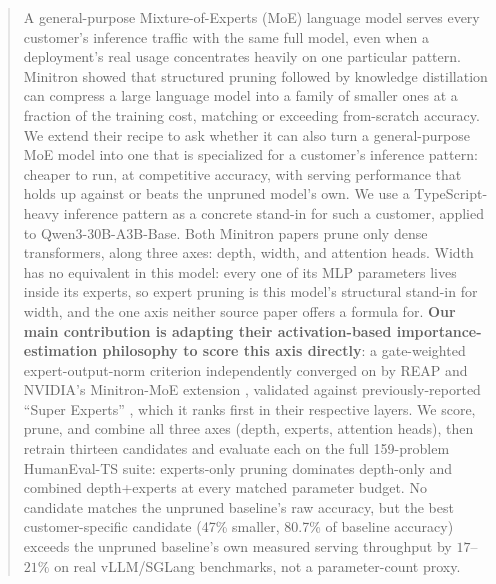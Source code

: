 \documentclass{article}
\theoremstyle{plain}
\theoremstyle{definition}
\theoremstyle{remark}
\begin{document}

{\let\thefootnote\relax{}}

\begin{abstract}
A general-purpose Mixture-of-Experts (MoE) language model serves every
customer's inference traffic with the same full model, even when a
deployment's real usage concentrates heavily on one particular pattern.
Minitron \cite{minitron2024,minitron2024practice} showed that structured
pruning followed by knowledge distillation can compress a large language
model into a family of smaller ones at a fraction of the training cost,
matching or exceeding from-scratch accuracy. We extend their recipe to
ask whether it can also turn a general-purpose MoE model into one that
is specialized for a customer's inference pattern: cheaper to run, at
competitive accuracy, with serving performance that holds up against or
beats the unpruned model's own. We use a TypeScript-heavy inference
pattern as a concrete stand-in for such a customer, applied to
Qwen3-30B-A3B-Base. Both Minitron papers prune only dense transformers,
along three axes: depth, width, and attention heads. Width has no
equivalent in this model: every one of its MLP parameters lives inside
its experts, so expert pruning is this model's structural stand-in for
width, and the one axis neither source paper offers a formula for.
\textbf{Our main contribution is adapting their activation-based
importance-estimation philosophy to score this axis directly}: a
gate-weighted expert-output-norm criterion independently converged on
by REAP \cite{reap2025} and NVIDIA's Minitron-MoE extension
\cite{modelopt2024}, validated against previously-reported ``Super
Experts'' \cite{superexperts2025}, which it ranks first in their
respective layers. We score, prune, and combine all three axes (depth,
experts, attention heads), then retrain thirteen candidates and evaluate
each on the full
159-problem HumanEval-TS suite: experts-only pruning dominates
depth-only and combined depth+experts at every matched parameter
budget. No candidate matches the unpruned baseline's raw accuracy, but
the best customer-specific candidate (47\% smaller, 80.7\% of baseline
accuracy) exceeds the unpruned baseline's own measured serving
throughput by $17$--$21\%$ on real vLLM/SGLang benchmarks, not a
parameter-count proxy.
\end{abstract}
\end{document}
